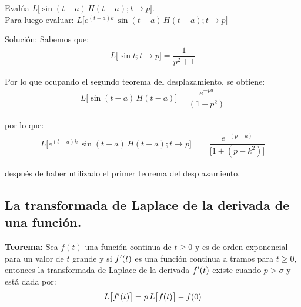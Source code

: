 \begin{ejemplo}
Evalúa $L \big[\sin (t - a) \, H(t- a); t \to p\big]$. \\
Para luego evaluar: $L \big[e^{(t-a) k} \, \sin (t - a) \, H(t- a); t \to p\big]$

Solución: Sabemos que:
\begin{align*}
L \big[\sin t; t \to p\big] = \dfrac{1}{p^{2} + 1}
\end{align*}

Por lo que ocupando el segundo teorema del desplazamiento, se obtiene:
\begin{align*}
L \big[\sin (t - a) \, H(t- a)\big] = \dfrac{e^{-p a}}{(1 + p^{2})}
\end{align*}

por lo que:
\begin{align*}
L \big[e^{(t-a) k} \, \sin (t - a) \, H(t- a); t \to p\big] &= \dfrac{e^{-(p - k)}}{\big[1 + (p - k^{2})\big]}
\end{align*}

después de haber utilizado el primer teorema del desplazamiento.
\end{ejemplo}

\subsection{La transformada de Laplace de la derivada de una función.}

\noindent \textbf{Teorema: } Sea $f(t)$ una función continua de $t \geq 0$ y es de orden exponencial para un valor de $t$ grande y si ${f}^{\prime}(t)$ es una función continua a tramos para $t \geq 0$, entonces la transformada de Laplace de la derivada ${f}^{\prime}(t)$ existe cuando $p > \sigma$ y está dada por:
\begin{align*}
L \big[{f}^{\prime}(t)\big] = p \, L \big[f(t)\big] - f(0)
\end{align*}

